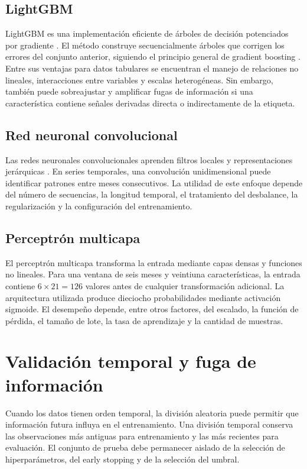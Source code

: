 \subsection{LightGBM}

LightGBM es una implementación eficiente de árboles de decisión potenciados por gradiente \cite{ke2017lightgbm}. El método construye secuencialmente árboles que corrigen los errores del conjunto anterior, siguiendo el principio general de gradient boosting \cite{friedman2001greedy}. Entre sus ventajas para datos tabulares se encuentran el manejo de relaciones no lineales, interacciones entre variables y escalas heterogéneas. Sin embargo, también puede sobreajustar y amplificar fugas de información si una característica contiene señales derivadas directa o indirectamente de la etiqueta.

\subsection{Red neuronal convolucional}

Las redes neuronales convolucionales aprenden filtros locales y representaciones jerárquicas \cite{lecun2015deep}. En series temporales, una convolución unidimensional puede identificar patrones entre meses consecutivos. La utilidad de este enfoque depende del número de secuencias, la longitud temporal, el tratamiento del desbalance, la regularización y la configuración del entrenamiento.

\subsection{Perceptrón multicapa}

El perceptrón multicapa transforma la entrada mediante capas densas y funciones no lineales. Para una ventana de seis meses y veintiuna características, la entrada contiene $6 \times 21 = 126$ valores antes de cualquier transformación adicional. La arquitectura utilizada produce dieciocho probabilidades mediante activación sigmoide. El desempeño depende, entre otros factores, del escalado, la función de pérdida, el tamaño de lote, la tasa de aprendizaje y la cantidad de muestras.

\section{Validación temporal y fuga de información}

Cuando los datos tienen orden temporal, la división aleatoria puede permitir que información futura influya en el entrenamiento. Una división temporal conserva las observaciones más antiguas para entrenamiento y las más recientes para evaluación. El conjunto de prueba debe permanecer aislado de la selección de hiperparámetros, del early stopping y de la selección del umbral.\\


